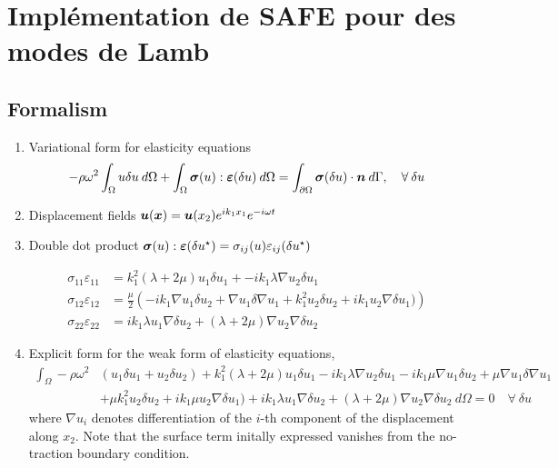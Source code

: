 \renewcommand{\thesection}{\Alph{section}}
\section{Implémentation de SAFE pour des modes de Lamb}

\subsection{Formalism}
\begin{enumerate}
    \item Variational form for elasticity equations
\begin{equation}
    - \rho \omega^2 \int_\Omega u \delta u \:d\Omega+ \int_\Omega \boldsymbol \sigma (u) : \boldsymbol \varepsilon (\delta u) \:d\Omega = \int_{\partial \Omega} \boldsymbol \sigma (\delta u) \cdot \boldsymbol n \:d\Gamma, \quad \forall \: \delta u
\end{equation}

\item Displacement fields $\boldsymbol u (\boldsymbol x) = \boldsymbol u(x_2) e^{ik_1 x_1}e^{-i\omega t}$
    
\item Double dot product $\boldsymbol \sigma (u) : \boldsymbol \varepsilon (\delta u ^\star) = \sigma_{ij}(u) \varepsilon_{ij}(\delta u ^\star)$

\begin{equation}
    \begin{aligned}
        \sigma_{11}\varepsilon_{11} &= k_1^2 (\lambda + 2\mu) u_1 \delta u_1 + - ik_1 \lambda \nabla u_2 \delta u_1 \\
        \sigma_{12}\varepsilon_{12} &= \frac \mu 2 \left(-ik_1 \nabla u_1 \delta u_2 + \nabla u_1 \delta \nabla u_1 + k_1^2 u_2\delta u_2 + ik_1 u_2 \nabla \delta u_1)\right) \\
        \sigma_{22}\varepsilon_{22} &= ik_1 \lambda u_1 \nabla \delta u_2 + (\lambda + 2\mu) \nabla u_2 \nabla \delta u_2
    \end{aligned}
\end{equation}

\item Explicit form for the weak form of elasticity equations, 
\begin{equation}
    \begin{aligned}
        \int_\Omega - \rho \omega^2 &\left(u_1 \delta u_1 + u_2 \delta u_2 \right) + k_1^2 (\lambda + 2\mu) u_1 \delta u_1 - ik_1 \lambda \nabla u_2 \delta u_1 -ik_1 \mu \nabla u_1 \delta u_2 + \mu \nabla u_1 \delta \nabla u_1 \\ &+ \mu k_1^2 u_2\delta u_2 + ik_1 \mu u_2 \nabla \delta u_1) + ik_1 \lambda u_1 \nabla \delta u_2 + (\lambda + 2\mu) \nabla u_2 \nabla \delta u_2 \:d\Omega =0 \quad \forall \: \delta u
    \end{aligned}
\end{equation}
where $\nabla u_i$ denotes differentiation of the $i$-th component of the displacement along $x_2$. Note that the surface term initally expressed vanishes from the no-traction boundary condition.


\end{enumerate}

